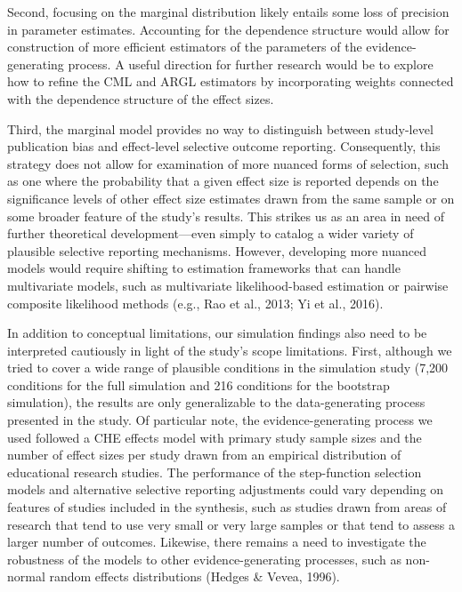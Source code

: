 \documentclass[
  man, donotrepeattitle,floatsintext]{apa7}
\begin{document}
Second, focusing on the marginal distribution likely entails some loss of precision in parameter estimates.
Accounting for the dependence structure would allow for construction of more efficient estimators of the parameters of the evidence-generating process.
A useful direction for further research would be to explore how to refine the CML and ARGL estimators by incorporating weights connected with the dependence structure of the effect sizes.

Third, the marginal model provides no way to distinguish between study-level publication bias and effect-level selective outcome reporting.
Consequently, this strategy does not allow for examination of more nuanced forms of selection, such as one where the probability that a given effect size is reported depends on the significance levels of other effect size estimates drawn from the same sample or on some broader feature of the study's results.
This strikes us as an area in need of further theoretical development---even simply to catalog a wider variety of plausible selective reporting mechanisms.
However, developing more nuanced models would require shifting to estimation frameworks that can handle multivariate models, such as multivariate likelihood-based estimation or pairwise composite likelihood methods (e.g., Rao et al., 2013; Yi et al., 2016).

In addition to conceptual limitations, our simulation findings also need to be interpreted cautiously in light of the study's scope limitations.
First, although we tried to cover a wide range of plausible conditions in the simulation study (7,200 conditions for the full simulation and 216 conditions for the bootstrap simulation), the results are only generalizable to the data-generating process presented in the study.
Of particular note, the evidence-generating process we used followed a CHE effects model with primary study sample sizes and the number of effect sizes per study drawn from an empirical distribution of educational research studies.
The performance of the step-function selection models and alternative selective reporting adjustments could vary depending on features of studies included in the synthesis, such as studies drawn from areas of research that tend to use very small or very large samples or that tend to assess a larger number of outcomes.
Likewise, there remains a need to investigate the robustness of the models to other evidence-generating processes, such as non-normal random effects distributions (Hedges \& Vevea, 1996).
\end{document}
